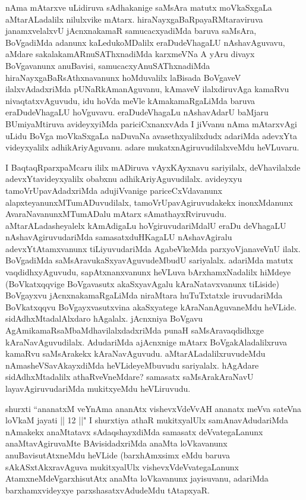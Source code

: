 \begin{artha}
nAma mAtarxve uLidiruva sAdhakanige saMsAra matutx moVkaSxgaLa aMtarALadalilx nilulxvike mAtarx. hiraNayxgaBaRpayaRMtaraviruva janamxvelalxvU jAcnxnakamaR samucacxyadiMda baruva saMsAra, BoVgadiMda adanunx kaLedukoMDalilx eraDudeVhagaLU nAshavAguvavu, aMdare sakalakamARnuSAThxnadiMda karxmeVNa A yAru divayx BoVgavanunx anuBavisi, samucacxyAnuSAThxnadiMda hiraNayxgaBaRsAthxnavanunx hoMduvalilx laBisada BoVgaveV ilalxvAdadxriMda pUNaRkAmanAguvanu, kAmaveV ilalxdiruvAga kamaRvu nivaqtatxvAguvudu, idu hoVda meVle kAmakamaRgaLiMda baruva eraDudeVhagaLU hoVguvavu. eraDudeVhagaLu nAshavAdarU baMjaru BUmiyaMtiruva avideyxyiMda pariciCxnanxvAda I jiVvanu nAma mAtarxvAgi uLidu BoVga moVkaSxgaLa naDuvaNa avasethxyalilxdudx adariMda adevxYta videyxyalilx adhikAriyAguvanu. adare mukatxnAgiruvudilalxveMdu heVLuvaru.
\end{artha}

\begin{artha}
I BaqtaqRparxpaMcaru ililx mADiruva vAyxKAyxnavu sariyilalx, deVhavilalxde adevxYtavideyxyalilx obabxnu adhikAriyAguvudilalx. avideyxyu tamoVrUpavAdadxriMda adujiVvanige pariceCxVdavanunx alapxteyanunxMTumADuvudilalx, tamoVrUpavAgiruvudakekx inonxMdanunx AvaraNavanunxMTumADalu mAtarx sAmathayxRviruvudu. aMtarALadasheyalelx kAmAdigaLu hoVgiruvudariMdalU eraDu deVhagaLU nAshavAgiruvudariMda samasatxduHKagaLU nAshavAgiralu adevxYtAtamxvanunx tiLiyuvudariMda AgabeVkeMda parxyoVjanaveVnU ilalx. BoVgadiMda saMsAravukaSxyavAguvudeMbudU sariyalalx. adariMda matutx vaqdidhxyAguvudu, sapAtxnanxvanunx heVLuva bArxhamxNadalilx hiMdeye (BoVkatxqqvige BoVgavasutx akaSxyavAgalu kAraNatavxvanunx tiLiside) BoVgayxvu jAcnxnakamaRgaLiMda niraMtara huTuTxtatxle iruvudariMda BoVkatxqqvu BoVgayxvasutxvina akaSxyatege kAraNanAguvaneMdu heVLide. sidAdhxMtadalAlxdaro hAgalalx. jAcnxniya BoVgavu AgAmikamaRsaMbaMdhavilalxdadxriMda punaH saMsAravaqdidhxge kAraNavAguvudilalx. AdudariMda ajAcnxnige mAtarx BoVgakAladalilxruva kamaRvu saMsArakekx kAraNavAguvudu. aMtarALadalilxruvudeMdu nAmasheVSavAkayxdiMda heVLideyeMbuvudu sariyalalx. hAgAdare sidAdhxMtadalilx athaRveVneMdare? samasatx saMsArakAraNavU layavAgiruvudariMda mukitxyeMdu heVLiruvudu.
\end{artha}

\begin{artha}
shurxti ``ananatxM veYnAma ananAtx vishevxVdeVvAH ananatx meVva sateVna loVkaM jayati || 12 ||" I shurxtiya athaR \ndash   mukitxyalUlx samAnavAdudariMda nAmakekx anaMtatavx sAdaqshayxdiMda samasatx deVvategaLanunx anaMtavAgiruvaMte BAvisidadxriMda anaMta loVkavanunx anuBavisutAtxneMdu heVLide (barxhAmxsimx eMdu baruva sAkASxtAkxravAguva mukitxyalUlx vishevxVdeVvategaLanunx AtamxneMdeVgarxhisutAtx anaMta loVkavanunx jayisuvanu, adariMda barxhamxvideyxye parxshasatxvAdudeMdu tAtapxyaR.
\end{artha}

